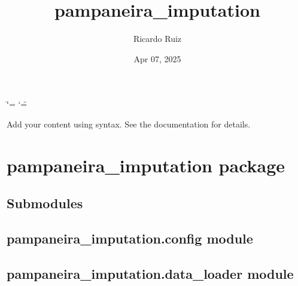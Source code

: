 \documentclass[letterpaper,10pt,english]{sphinxmanual}
\title{pampaneira\_imputation}
\date{Apr 07, 2025}
\author{Ricardo Ruiz}
\begin{document}
\ifdefined\shorthandoff
  \ifnum\catcode`\=\string=\active\shorthandoff{=}\fi
  \ifnum\catcode`\"=\active{}\fi
\fi

\pagestyle{empty}
\sphinxmaketitle
\pagestyle{plain}
\sphinxtableofcontents
\pagestyle{normal}
\label{\detokenize{index::doc}}


\sphinxAtStartPar
Add your content using  syntax. See the
documentation for details.

\sphinxstepscope


\chapter{pampaneira\_imputation package}
\label{\detokenize{pampaneira_imputation:pampaneira-imputation-package}}\label{\detokenize{pampaneira_imputation::doc}}

\section{Submodules}
\label{\detokenize{pampaneira_imputation:submodules}}

\section{pampaneira\_imputation.config module}
\label{\detokenize{pampaneira_imputation:module-pampaneira_imputation.config}}\label{\detokenize{pampaneira_imputation:pampaneira-imputation-config-module}}

\section{pampaneira\_imputation.data\_loader module}
\label{\detokenize{pampaneira_imputation:module-pampaneira_imputation.data_loader}}\label{\detokenize{pampaneira_imputation:pampaneira-imputation-data-loader-module}}
\end{document}
